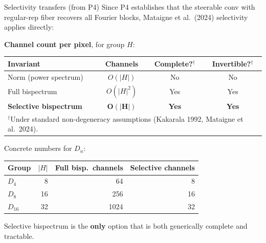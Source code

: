 \documentclass[aspectratio=169]{beamer}
\begin{document}
\begin{frame}{Selectivity transfers (from P4)}\small
  Since P4 establishes that the steerable conv with regular-rep fiber recovers all Fourier blocks, Mataigne et al.\ (2024) selectivity applies directly:

  \medskip

  \textbf{Channel count per pixel}, for group $H$:

  \vspace{-4pt}
  \begin{center}\scriptsize
  \begin{tabular}{lccc}
    \toprule
    \textbf{Invariant} & \textbf{Channels} & \textbf{Complete?}$^\dagger$ & \textbf{Invertible?}$^\dagger$ \\
    \midrule
    Norm (power spectrum) & $O(|H|)$ & No & No \\
    Full bispectrum & $O(|H|^2)$ & Yes & Yes \\
    \textbf{Selective bispectrum} & $\boldsymbol{O(|H|)}$ & \textbf{Yes} & \textbf{Yes} \\
    \multicolumn{4}{l}{\tiny $^\dagger$Under standard non-degeneracy assumptions (Kakarala 1992, Mataigne et al.\ 2024).}\\
    \bottomrule
  \end{tabular}
  \end{center}

  \vspace{-2pt}

  Concrete numbers for $D_n$:

  \vspace{-4pt}
  \begin{center}\scriptsize
  \begin{tabular}{lrrr}
    \toprule
    Group & $|H|$ & Full bisp.\ channels & Selective channels \\
    \midrule
    $D_4$ & 8 & 64 & 8 \\
    $D_8$ & 16 & 256 & 16 \\
    $D_{16}$ & 32 & 1024 & 32 \\
    \bottomrule
  \end{tabular}
  \end{center}

  \vspace{-2pt}

  Selective bispectrum is the \textbf{only} option that is both generically complete and tractable.
\end{frame}
\end{document}

